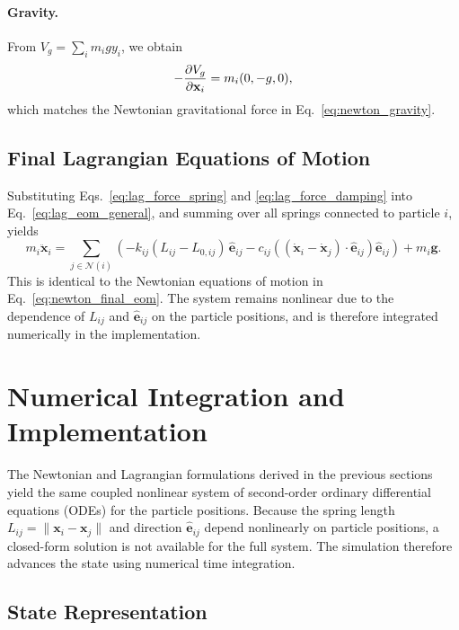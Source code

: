 \documentclass[manuscript,nonacm,12pt,letterpaper]{acmart}
\begin{document}
\paragraph{Gravity.}
From $V_g=\sum_i m_i g y_i$, we obtain
\[
-\pdv{V_g}{\mathbf{x}_i} = m_i(0,-g,0),
\]
which matches the Newtonian gravitational force in Eq.~\eqref{eq:newton_gravity}.

\subsection{Final Lagrangian Equations of Motion}
\label{Sec5.7:Final}

Substituting Eqs.~\eqref{eq:lag_force_spring} and \eqref{eq:lag_force_damping} into Eq.~\eqref{eq:lag_eom_general}, and summing over all springs connected to particle $i$, yields
\begin{equation}
m_i \ddot{\mathbf{x}}_i
=
\sum_{j\in \mathcal{N}(i)}
\left(
-k_{ij}(L_{ij}-L_{0,ij})\,\hat{\mathbf{e}}_{ij}
-c_{ij}\left((\dot{\mathbf{x}}_i-\dot{\mathbf{x}}_j)\cdot \hat{\mathbf{e}}_{ij}\right)\hat{\mathbf{e}}_{ij}
\right)
+ m_i\mathbf{g}.
\label{eq:lag_final_eom}
\end{equation}
This is identical to the Newtonian equations of motion in Eq.~\eqref{eq:newton_final_eom}. The system remains nonlinear due to the dependence of $L_{ij}$ and $\hat{\mathbf{e}}_{ij}$ on the particle positions, and is therefore integrated numerically in the implementation.


\section{Numerical Integration and Implementation}
\label{Sec6:Integration}

The Newtonian and Lagrangian formulations derived in the previous sections yield the same coupled nonlinear system of second-order ordinary differential equations (ODEs) for the particle positions. Because the spring length $L_{ij}=\|\mathbf{x}_i-\mathbf{x}_j\|$ and direction $\hat{\mathbf{e}}_{ij}$ depend nonlinearly on particle positions, a closed-form solution is not available for the full system. The simulation therefore advances the state using numerical time integration.

\subsection{State Representation}
\label{Sec6.1:State}
\end{document}
